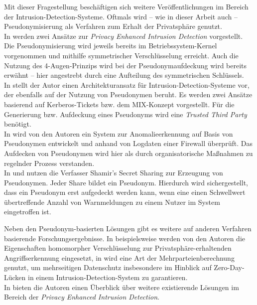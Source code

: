 Mit dieser Fragestellung beschäftigen sich weitere Veröffentlichungen im Bereich der Intrusion-Detection-Systeme. Oftmals wird -- wie in dieser Arbeit auch -- Pseudonymisierung als Verfahren zum Erhalt der Privatsphäre genutzt.\\
In \cite{sobirey1997pseudonymous} werden zwei Ansätze zur \textit{Privacy Enhanced Intrusion Detection} vorgestellt. Die Pseudonymisierung wird jeweils bereits im Betriebssystem-Kernel vorgenommen und mithilfe symmetrischer Verschlüsselung erreicht. Auch die Nutzung des 4-Augen-Prinzips wird bei der Pseudonymaufdeckung wird bereits erwähnt -- hier angestrebt durch eine Aufteilung des symmetrischen Schlüssels.\\
In \cite{buschkes1999privacy} stellt der Autor einen Architekturansatz für Intrusion-Detection-Systeme vor, der ebenfalls auf der Nutzung von Pseudonymen beruht. Es werden zwei Ansätze basierend auf Kerberos-Tickets bzw. dem MIX-Konzept vorgestellt. Für die Generierung bzw. Aufdeckung eines Pseudonyms wird eine \textit{Trusted Third Party} benötigt.\\
In \cite{lundin2000anomaly} wird von den Autoren ein System zur Anomalieerkennung auf Basis von Pseudonymen entwickelt und anhand von Logdaten einer Firewall überprüft. Das Aufdecken von Pseudonymen wird hier als durch organisatorische Maßnahmen zu regelnder Prozess verstanden.\\
In \cite{biskup2000threshold} und \cite{biskup2001pseudonymization} nutzen die Verfasser Shamir's Secret Sharing zur Erzeugung von Pseudonymen. Jeder Share bildet ein Pseudonym. Hierdurch wird sichergestellt, dass ein Pseudonym erst aufgedeckt werden kann, wenn eine einen Schwellwert übertreffende Anzahl von Warnmeldungen zu einem Nutzer im System eingetroffen ist.




Neben den Pseudonym-basierten Lösungen gibt es weitere auf anderen Verfahren basierende Forschungsergebnisse. In \cite{park2007ppids} beispielsweise werden von den Autoren die Eigenschaften homomorpher Verschlüsselung zur Privatsphäre-erhaltenden Angriffserkennung eingesetzt, in \cite{niksefat2013zids} wird eine Art der Mehrparteienberechnung genutzt, um mehrseitigen Datenschutz insbesondere im Hinblick auf Zero-Day-Lücken in einem Intrusion-Detection-System zu garantieren.\\
In \cite{niksefat2017privacy} bieten die Autoren einen Überblick über weitere existierende Lösungen im Bereich der \textit{Privacy Enhanced Intrusion Detection}.


